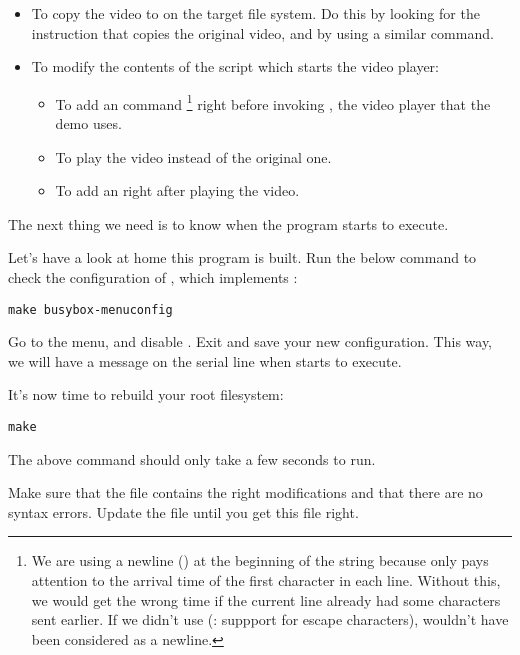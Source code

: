 \begin{itemize}
\item To copy the  video to  on the target
      file system. Do this by looking for the instruction that copies the 
      original video, and by using a similar command.
\item To modify the contents of the  script
      which starts the video player: 
      \begin{itemize}
      \item To add an  command
	    \footnote{We are using a newline (\code{\n}) at the
beginning of the string because  only pays attention to
the arrival time of the first character in each line. Without this, we
would get the wrong time if the current line already had some
characters sent earlier. If we didn't use  (:
suppport for escape characters), \code{\n} wouldn't have been considered
as a newline.}
            right before invoking , the video player that the demo
	    uses.
      \item To play the  video instead of the original
  	    one.
      \item To add an  right after
 	    playing the video.
      \end{itemize}
\end{itemize}

The next thing we need is to know when the  program starts to
execute. 

Let's have a look at home this program is built. Run the below command
to check the configuration of , which implements
:

\begin{verbatim}
make busybox-menuconfig
\end{verbatim}

Go to the  menu, and disable . Exit and save your new configuration. This way, we will have
a message on the serial line when  starts to execute.

It's now time to rebuild your root filesystem:
\begin{verbatim}
make
\end{verbatim}

The above command should only take a few seconds to run.

Make sure that the  file
contains the right modifications and that there are no syntax errors.
Update the  file until
you get this file right.


